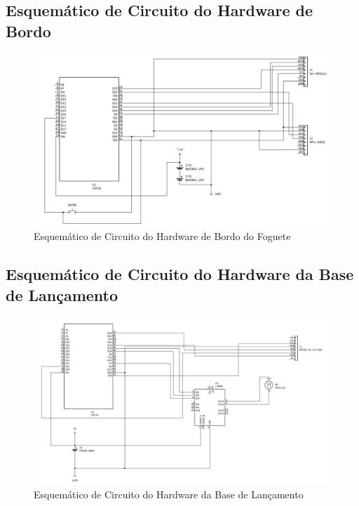 \subsection{Esquemático de Circuito do Hardware de Bordo}
\begin{figure}[H]
    \centering
    \includegraphics[width=\linewidth]{figuras/hardware/esquematico.png}
    \caption{Esquemático de Circuito do Hardware de Bordo do Foguete}
    \label{fig:esquematico_de_bordo}
\end{figure}


\subsection{Esquemático de Circuito do Hardware da Base de Lançamento}

\begin{figure}[H]
    \centering
    \includegraphics[width=\linewidth]{figuras/hardware/esquematicoBase.png}
    \caption{Esquemático de Circuito do Hardware da Base de Lançamento}
    \label{fig:esquematico_base}
\end{figure}

